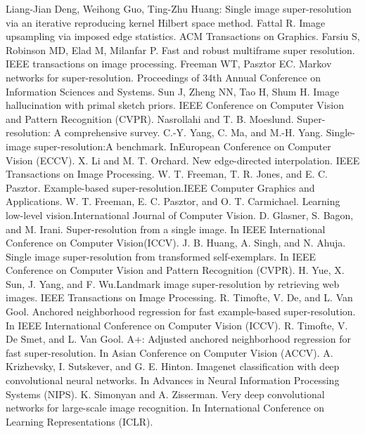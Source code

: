 \documentclass[12pt]{article}
\begin{document}
	\clearpage
	\begin{thebibliography}{999}
		 Liang-Jian Deng, Weihong Guo, Ting-Zhu Huang: Single image super-resolution via an iterative reproducing kernel Hilbert space method.
		 Fattal R. Image upsampling via imposed edge statistics. ACM Transactions on Graphics.
		 Farsiu S, Robinson MD, Elad M, Milanfar P. Fast and robust multiframe super resolution. IEEE transactions on image processing.
		 Freeman WT, Pasztor EC. Markov networks for super-resolution. Proceedings of 34th Annual Conference on Information Sciences and Systems.
		 Sun J, Zheng NN, Tao H, Shum H. Image hallucination with primal sketch priors. IEEE Conference on Computer Vision and Pattern Recognition (CVPR).
		 Nasrollahi and T. B. Moeslund.  Super-resolution: A comprehensive survey.
		 C.-Y. Yang, C. Ma, and M.-H. Yang. Single-image super-resolution:A benchmark. InEuropean Conference on Computer Vision (ECCV).
		 X. Li and M. T. Orchard. New edge-directed interpolation. IEEE Transactions on Image Processing.
		 W. T. Freeman, T. R. Jones, and E. C. Pasztor. Example-based super-resolution.IEEE Computer Graphics and Applications.
		 W. T. Freeman, E. C. Pasztor, and O. T. Carmichael. Learning low-level vision.International Journal of Computer Vision.
		 D. Glasner, S. Bagon, and M. Irani. Super-resolution from a single image. In IEEE  International Conference  on  Computer  Vision(ICCV).
		 J. B. Huang, A. Singh, and N. Ahuja. Single image super-resolution from transformed self-exemplars. In IEEE Conference on Computer Vision and Pattern Recognition (CVPR).
		 H. Yue,  X. Sun,  J. Yang, and  F. Wu.Landmark image super-resolution by retrieving web images. IEEE Transactions on Image Processing.
		 R. Timofte, V. De, and L. Van Gool. Anchored neighborhood regression for fast example-based super-resolution.  In IEEE International Conference on Computer Vision (ICCV).
		 R. Timofte, V. De Smet, and L. Van Gool. A+: Adjusted anchored neighborhood regression for fast super-resolution.  In Asian Conference on Computer Vision (ACCV).
		 A. Krizhevsky, I. Sutskever, and G. E. Hinton. Imagenet classification with deep convolutional neural networks. In Advances in Neural Information Processing Systems (NIPS).
		 K. Simonyan and A. Zisserman. Very deep convolutional networks for large-scale image recognition. In International Conference on Learning Representations (ICLR).

\end{thebibliography}
\end{document}
